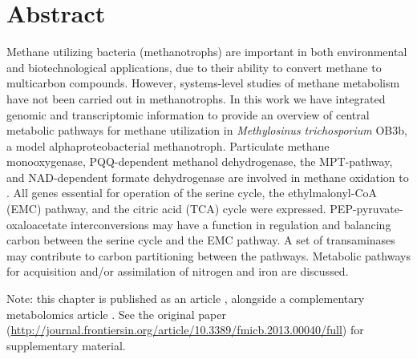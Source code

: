 

\section{Abstract}
Methane utilizing bacteria (methanotrophs) are important in both environmental and biotechnological applications, due to their ability to convert methane to multicarbon compounds.
However, systems-level studies of methane metabolism have not been carried out in methanotrophs.
In this work we have integrated genomic and transcriptomic information to provide an overview of central metabolic pathways for methane utilization in \textit{Methylosinus trichosporium} OB3b, a model alphaproteobacterial methanotroph.
Particulate methane monooxygenase, PQQ-dependent methanol dehydrogenase, the MPT-pathway, and NAD-dependent formate dehydrogenase are involved in methane oxidation to .
All genes essential for operation of the serine cycle, the ethylmalonyl-CoA (EMC) pathway, and the citric acid (TCA) cycle were expressed.
PEP-pyruvate-oxaloacetate interconversions may have a function in regulation and balancing carbon between the serine cycle and the EMC pathway.
A set of transaminases may contribute to carbon partitioning between the pathways.
Metabolic pathways for acquisition and/or assimilation of nitrogen and iron are discussed.

Note: this chapter is published as an article \cite{matsenOB3b}, alongside a complementary metabolomics article \cite{yangOB3b}.
See the original paper (\url{http://journal.frontiersin.org/article/10.3389/fmicb.2013.00040/full}) for supplementary material.

